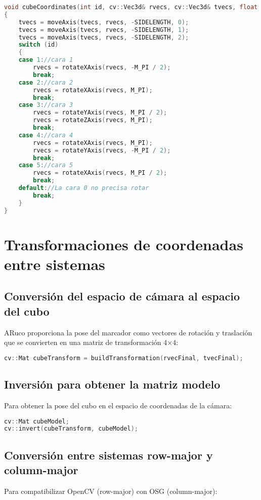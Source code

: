 \begin{lstlisting}[language=C++]
void cubeCoordinates(int id, cv::Vec3d& rvecs, cv::Vec3d& tvecs, float sideLength)
{
    tvecs = moveAxis(tvecs, rvecs, -SIDELENGTH, 0);
    tvecs = moveAxis(tvecs, rvecs, -SIDELENGTH, 1);
    tvecs = moveAxis(tvecs, rvecs, -SIDELENGTH, 2);
    switch (id)
    {
    case 1://cara 1
        rvecs = rotateXAxis(rvecs, -M_PI / 2);
        break;
    case 2://cara 2
        rvecs = rotateXAxis(rvecs, M_PI);
        break;
    case 3://cara 3
        rvecs = rotateYAxis(rvecs, M_PI / 2);
        rvecs = rotateZAxis(rvecs, M_PI);
        break;
    case 4://cara 4
        rvecs = rotateXAxis(rvecs, M_PI);
        rvecs = rotateYAxis(rvecs, -M_PI / 2);
        break;
    case 5://cara 5
        rvecs = rotateXAxis(rvecs, M_PI / 2);
        break;
    default://La cara 0 no precisa rotar
        break;
    }
}
\end{lstlisting}

\section{Transformaciones de coordenadas entre sistemas}

\subsection{Conversión del espacio de cámara al espacio del cubo}
ARuco proporciona la pose del marcador como vectores de rotación y traslación que se convierten en una matriz de transformación 4×4:

\begin{lstlisting}[language=C++]
cv::Mat cubeTransform = buildTransformation(rvecFinal, tvecFinal);
\end{lstlisting}

\subsection{Inversión para obtener la matriz modelo}
Para obtener la pose del cubo en el espacio de coordenadas de la cámara:

\begin{lstlisting}[language=C++]
cv::Mat cubeModel;
cv::invert(cubeTransform, cubeModel);
\end{lstlisting}

\subsection{Conversión entre sistemas row-major y column-major}
Para compatibilizar OpenCV (row-major) con OSG (column-major):

